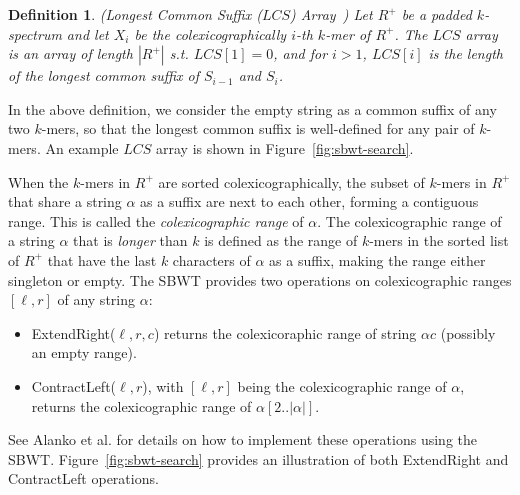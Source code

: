 \documentclass[unnumsec,webpdf,modern,large]{biorxiv}%
\theoremstyle{thmstyleone}%
\theoremstyle{thmstyletwo}%
\theoremstyle{thmstylethree}%
\newtheorem{definition}{Definition}
\begin{document}
\begin{definition}\label{def:LCS-array}(Longest Common Suffix ($LCS$) Array~\cite{alanko2023longest})     
Let $R^+$ be a padded $k$-spectrum and let $X_i$ be the colexicographically $i$-th $k$-mer of $R^+$. 
The $LCS$ array is an array of length $|R^+|$ s.t. $LCS[1] = 0$, and for $i > 1$, $LCS[i]$ is the length of the longest common suffix of $S_{i-1}$ and $S_i$.
\end{definition}
 In the above definition, we consider the empty string as a common suffix of any two $k$-mers, so that the longest common suffix is well-defined for any pair of $k$-mers.
An example $LCS$ array is shown in Figure~\ref{fig:sbwt-search}.

When the $k$-mers in $R^+$ are sorted colexicographically, the subset of $k$-mers in $R^+$ that share a string $\alpha$ as a suffix are next to each other, forming a contiguous range. This is called the \emph{colexicographic range} of $\alpha$. The colexicographic range of a string $\alpha$ that is \emph{longer} than $k$ is defined as the range of $k$-mers in the sorted list of $R^+$ that have the last $k$ characters of $\alpha$ as a suffix, making the range either singleton or empty. %
The SBWT provides two operations on colexicographic ranges $[\ell, r]$ of any string $\alpha$: 

\begin{itemize}
\item ExtendRight($\ell, r, c$) returns the colexicoraphic range of string $\alpha c$ (possibly an empty range).
\item ContractLeft($\ell, r$), with $[\ell, r]$ being the colexicographic range of $\alpha$, returns the colexicographic range of $\alpha[2..|\alpha|]$.
\end{itemize}

See Alanko et al. \cite{alanko2024finimizers} for details on how to implement these operations using the SBWT. Figure~\ref{fig:sbwt-search} provides an illustration of both ExtendRight and ContractLeft operations.

\end{document}

